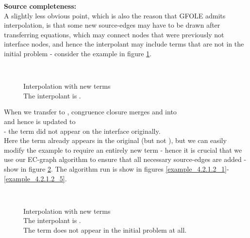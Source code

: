 \textbf{Source completeness:}\\
A slightly less obvious point, which is also the reason that GFOLE admits interpolation, is that some new source-edges may have to be drawn after transferring equations, which may connect nodes that were previously not interface nodes, and hence the interpolant may include terms that are not in the initial problem - consider the example in figure \ref{example_4.2.1.2_0}.

\begin{figure}
\\
\caption{Interpolation with new terms\\
The interpolant is .\\
}
\label{example_4.2.1.2_0}
\end{figure}

When we transfer  to , congruence closure merges  and  into\\  and hence  is updated to\\
  - the term  did not appear on the interface originally.\\
Here the term  already appears in the original  (but not ), but we can easily modify the example to require an entirely new term - hence it is crucial that we use our EC-graph algorithm to ensure that all necessary source-edges are added - show in figure \ref{example_4.2.1.3_0}. The algorithm run is show in figures \ref{example_4.2.1.2_1}-\ref{example_4.2.1.2_5}.


\begin{figure}
\\
\caption{Interpolation with new terms\\
The interpolant is .\\
The term  does not appear in the initial problem at all.
}
\label{example_4.2.1.3_0}
\end{figure}


